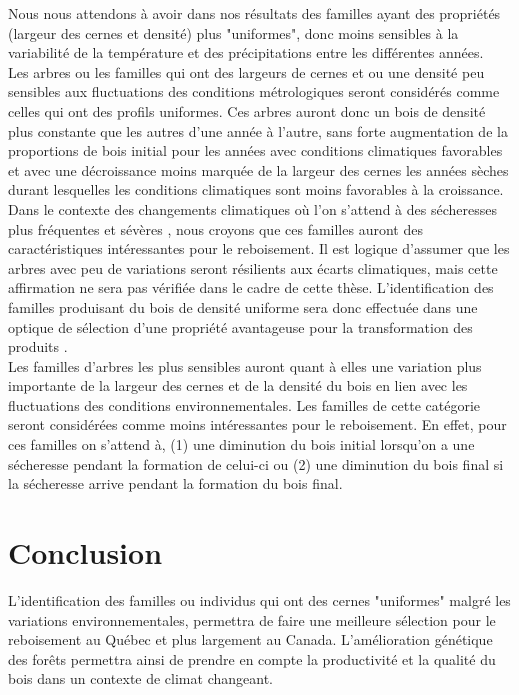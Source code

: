 \documentclass[a4paper,12pt]{report}
\begin{document}
Nous nous attendons à avoir dans nos résultats des familles ayant des propriétés (largeur des cernes et densité) plus "uniformes", donc moins sensibles à la variabilité de la température et des précipitations entre les différentes années.\\ 

Les arbres ou les familles qui ont des largeurs de cernes et ou une densité peu sensibles aux fluctuations des conditions métrologiques seront considérés comme celles qui ont des profils uniformes. Ces arbres auront donc un bois de densité plus constante que les autres d'une année à l'autre, sans forte augmentation de la proportions de bois initial pour les années avec conditions climatiques favorables et avec une décroissance moins marquée de la largeur des cernes les années sèches durant lesquelles les conditions climatiques sont moins favorables à la croissance. Dans le contexte des changements climatiques où l'on s'attend à des sécheresses plus fréquentes et sévères \citep{IPCC_2015}, nous croyons que ces familles auront des caractéristiques intéressantes pour le reboisement. Il est logique d'assumer que les arbres avec peu de variations seront résilients aux écarts climatiques, mais cette affirmation ne sera pas vérifiée dans le cadre de cette thèse. L'identification des familles produisant du bois de densité uniforme sera donc effectuée dans une optique de sélection d'une propriété avantageuse pour la transformation des produits \citep{Hernandez2001}. \\ 

Les familles d'arbres les plus sensibles auront quant à elles une variation plus importante de la largeur des cernes et de la densité du bois en lien avec les fluctuations des conditions environnementales. Les familles de cette catégorie seront considérées comme moins intéressantes pour le reboisement. En effet, pour ces familles on s'attend à, (1) une diminution du bois initial lorsqu'on a une sécheresse pendant la formation de celui-ci ou (2) une diminution du bois final si la sécheresse arrive pendant la formation du bois final.\\


\section{Conclusion}

L'identification des familles ou individus qui ont des cernes "uniformes" malgré les variations environnementales, permettra de faire une meilleure sélection pour le reboisement au Québec et plus largement au Canada. L'amélioration génétique des forêts permettra ainsi de prendre en compte la productivité et la qualité du bois dans un contexte de climat changeant.\\
\end{document}

